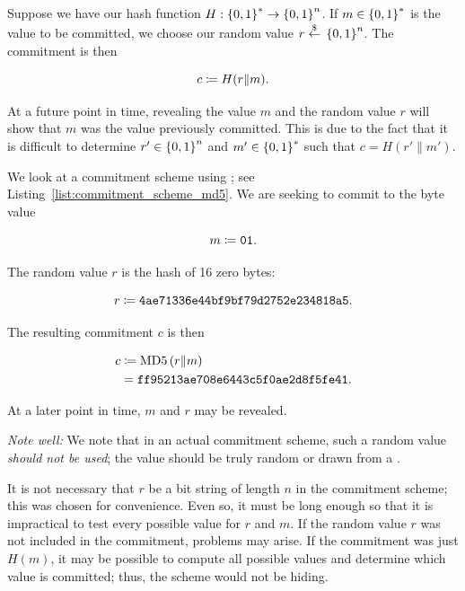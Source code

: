 Suppose we have our \gls{hash function} $H:\left\{ 0,1 \right\}^{*}\to\left\{ 0,1 \right\}^{n}$.
If $m\in\left\{ 0,1 \right\}^{*}$ is the value to be committed,
we choose our random value $r\stackrel{\$}{\leftarrow}{}\left\{ 0,1 \right\}^{n}$.
The commitment is then

\begin{equation}
    c \coloneqq{} H(r\|m).
\end{equation}

\noindent
At a future point in time, revealing the value $m$ and the random value $r$
will show that $m$ was the value previously committed.
This is due to the fact that it is difficult to determine
$r'\in\left\{ 0,1 \right\}^{n}$ and $m'\in\left\{ 0,1 \right\}^{*}$
such that $c = H(r'\|m')$.

\begin{example}

We look at a commitment scheme using \MDFive{};
see Listing~\ref{list:commitment_scheme_md5}.
We are seeking to commit to the byte value

\begin{equation}
    m \coloneqq{} \texttt{01}.
\end{equation}

\noindent
The random value $r$ is the \MDFive{} hash of 16 zero bytes:

\begin{equation}
    r \coloneqq{} \texttt{4ae71336e44bf9bf79d2752e234818a5}.
\end{equation}

\noindent
The resulting commitment $c$ is then

\begin{align}
    c &\coloneqq{} \text{MD5{}}\left( r\|m \right) \nonumber\\
        &= \texttt{ff95213ae708e6443c5f0ae2d8f5fe41}.
\end{align}

\noindent
At a later point in time, $m$ and $r$ may be revealed.



\emph{Note well:} We note that in an actual commitment scheme,
such a random value \emph{should not be used};
the value should be truly random or drawn from a .
\end{example}

It is not necessary that $r$ be a bit string of length $n$
in the commitment scheme;
this was chosen for convenience.
Even so, it must be long enough so that it is impractical
to test every possible value for $r$ and $m$.
If the random value $r$ was not included in the commitment,
problems may arise.
If the commitment was just $H(m)$,
it may be possible to compute all possible values
and determine which value is committed;
thus, the scheme would not be hiding.



